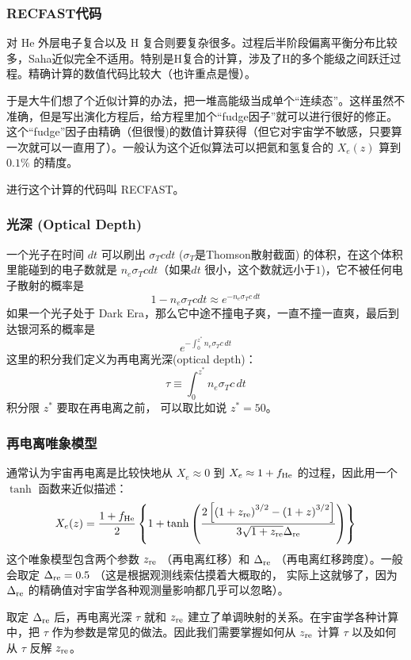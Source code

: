 \documentclass[CJK,13pt]{beamer}
\begin{document}
  \begin{frame}
    \frametitle{RECFAST代码}
    对 He 外层电子复合以及 H 复合则要复杂很多。过程后半阶段偏离平衡分布比较多，Saha近似完全不适用。特别是H复合的计算，涉及了H的多个能级之间跃迁过程。精确计算的数值代码比较大（也许重点是慢）。

    \skipline

    于是大牛们想了个近似计算的办法，把一堆高能级当成单个“连续态”。这样虽然不准确，但是写出演化方程后，给方程里加个“fudge因子”就可以进行很好的修正。这个“fudge”因子由精确（但很慢)的数值计算获得（但它对宇宙学不敏感，只要算一次就可以一直用了）。一般认为这个近似算法可以把氦和氢复合的 $X_e(z)$ 算到 $0.1\%$ 的精度。

      \skipline
      
      进行这个计算的代码叫 {\blue RECFAST}。

      \skipline
    
  \end{frame}



  
  \begin{frame}
    \frametitle{光深 (Optical Depth)}
    一个光子在时间 $dt$ 可以刷出 $\sigma_Tcdt$ ($\sigma_T$是Thomson散射截面) 的体积，在这个体积里能碰到的电子数就是 $n_e\sigma_Tcdt $（如果$dt$ 很小，这个数就远小于$1$)，它不被任何电子散射的概率是
      $$1-n_e\sigma_Tcdt \approx  e^{-n_e\sigma_T c\,dt} $$
      如果一个光子处于 Dark Era，那么它中途不撞电子爽，一直不撞一直爽，最后到达银河系的概率是
      $$ e^{-\int_0^{z^*}n_e\sigma_T c\, dt} $$
      这里的积分我们定义为再电离{\blue 光深(optical depth)}：
      $$\tau \equiv \int_0^{z^*}n_e\sigma_T c\,dt$$
      积分限 $z^*$ 要取在再电离之前， 可以取比如说 $z^*=50$。
  \end{frame}


  \begin{frame}
    \frametitle{再电离唯象模型}
    通常认为宇宙再电离是比较快地从 $X_e\approx 0$ 到 $X_e\approx 1+ f_{\rm He}$ 的过程，因此用一个 $\tanh$ 函数来近似描述：
    $$ X_e(z) =  \frac{1 + f_{\rm He}}{2}\left\{1+\tanh\left(\frac{2\left[\left(1+z_{\rm re}\right)^{3/2}-\left(1+z\right)^{3/2}\right]}{3\sqrt{1+z_{\rm re}} \Delta_{\rm re}}\right)\right\}$$
    这个唯象模型包含两个参数 $z_{\rm re}$ （再电离红移）和 $\Delta_{\rm re}$ （再电离红移跨度）。一般会取定 $\Delta_{\rm re} = 0.5$ （这是根据观测线索估摸着大概取的， 实际上这就够了，因为$\Delta_{\rm re}$ 的精确值对宇宙学各种观测量影响都几乎可以忽略）。     

    \skiplines
    
    取定 $\Delta_{\rm re}$ 后，再电离光深 $\tau$ 就和 $z_{\rm re}$ 建立了单调映射的关系。在宇宙学各种计算中，把 $\tau$ 作为参数是常见的做法。因此我们需要掌握如何从 $z_{\rm re}$ 计算 $\tau$ 以及如何从 $\tau$ 反解 $z_{\rm re}$。
  \end{frame}
  
\end{document}
